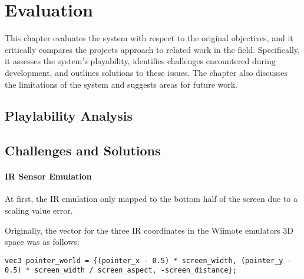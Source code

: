 \chapter{Evaluation}
\label{chapter:evaluation}

This chapter evaluates the system with respect to the original objectives, and it critically compares the projects approach to related work in the field. Specifically, it assesses the system's playability, identifies challenges encountered during development, and outlines solutions to these issues. The chapter also discusses the limitations of the system and suggests areas for future work.

\section{Playlability Analysis}
\label{sec:playability-analysis}



\section{Challenges and Solutions}


\subsubsection{IR Sensor Emulation}
At first, the IR emulation only mapped to the bottom half of the screen due to a scaling value error.

Originally, the vector for the three IR coordinates in the Wiimote emulators 3D space was as follows:
\begin{lstlisting}[style=CStyle, emph={vec3}, emphstyle={\color{magenta}}]
vec3 pointer_world = {(pointer_x - 0.5) * screen_width, (pointer_y - 0.5) * screen_width / screen_aspect, -screen_distance};
\end{lstlisting}

